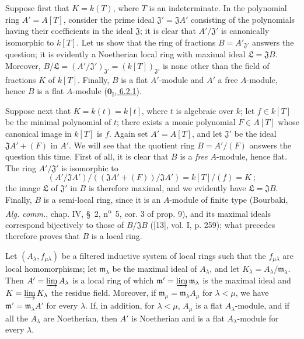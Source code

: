 \begin{env}[10.3.1.1]
\label{0.10.3.1.1}
Suppose first that $K=k(T)$, where $T$ is an indeterminate. In the
polynomial ring $A'=A[T]$, consider the prime ideal
$\mathfrak J'=\mathfrak J A'$ consisting of the
polynomials having their coefficients in the ideal $\mathfrak J$; it is clear
that $A'/\mathfrak J'$ is canonically isomorphic to $k[T]$. Let us show that
the ring of fractions $B=A'_{\mathfrak J'}$ answers the question; it is
evidently a Noetherian local ring with maximal ideal
$\mathfrak L=\mathfrak J B$. Moreover,
$B/\mathfrak L=(A'/\mathfrak J')_{\mathfrak J'}=(k[T])_{\mathfrak J'}$
is none other than the field of fractions $K$ of $k[T]$. Finally, $B$ is a
flat $A'$-module and $A'$ a free $A$-module, hence $B$ is a flat $A$-module
(\hyperref[0.6.2.1]{$\mathbf{0}_{\mathrm I}$, 6.2.1}).
\end{env}

\begin{env}[10.3.1.2]
\label{0.10.3.1.2}
Suppose next that $K=k(t)=k[t]$, where $t$ is algebraic over $k$; let
$f\in k[T]$ be the minimal polynomial of $t$; there exists a monic polynomial
$F\in A[T]$ whose canonical image in $k[T]$ is $f$. Again set
$A'=A[T]$, and let $\mathfrak J'$ be the ideal $\mathfrak J A'+(F)$ in $A'$.
We will see that the quotient ring $B=A'/(F)$ answers the question this
time. First of all, it is clear that $B$ is a \emph{free} $A$-module,
hence flat. The ring $A'/\mathfrak J'$ is isomorphic to
\[
  (A'/\mathfrak J A')/((\mathfrak J A'+(F))/\mathfrak J A')
  =k[T]/(f)=K~;
\]
the image $\mathfrak L$ of $\mathfrak J'$ in $B$ is therefore maximal, and we
evidently have $\mathfrak L=\mathfrak J B$. Finally, $B$ is a semi-local ring,
since it is an $A$-module of finite type (Bourbaki, \emph{Alg. comm.}, chap.
IV, \S~2, n\textsuperscript{o}~5, cor. 3 of prop. 9), and its maximal ideals correspond bijectively to those of $B/\mathfrak J B$
([13], vol. I, p. 259); what precedes therefore proves that $B$ is a
local ring.
\end{env}

\begin{lemma}[10.3.1.3]
\label{0.10.3.1.3}
Let $(A_\lambda,f_{\mu\lambda})$ be a filtered inductive system of local
rings such that the $f_{\mu\lambda}$ are local homomorphisms; let
$\mathfrak m_\lambda$ be the maximal ideal of $A_\lambda$, and let
$K_\lambda=A_\lambda/\mathfrak m_\lambda$. Then
$A'=\varinjlim A_\lambda$ is a local ring of which
$\mathfrak m'=\varinjlim\mathfrak m_\lambda$ is the maximal ideal and
$K=\varinjlim K_\lambda$ the residue field. Moreover, if
$\mathfrak m_\mu=\mathfrak m_\lambda A_\mu$ for $\lambda<\mu$, we have
$\mathfrak m'=\mathfrak m_\lambda A'$ for every $\lambda$. If, in addition, for
$\lambda<\mu$, $A_\mu$ is a flat $A_\lambda$-module, and if all the
$A_\lambda$ are Noetherian, then $A'$ is Noetherian and is a flat
$A_\lambda$-module for every $\lambda$.
\end{lemma}

